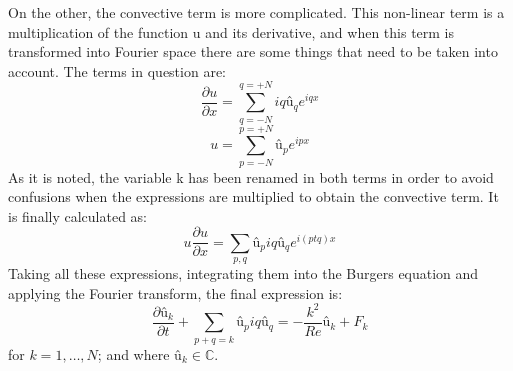 On the other, the convective term is more complicated. This non-linear term is a multiplication of the function u and its derivative, and when this term is transformed into Fourier space there are some things that need to be taken into account. The terms in question are:
\begin{equation}
\frac{\partial u}{\partial x}=\sum_{q=-N}^{q=+N}iqû_{q}e^{iqx}
\end{equation}
\begin{equation}
u=\sum_{p=-N}^{p=+N}û_{p}e^{ipx}
\end{equation}
As it is noted, the variable k has been renamed in both terms in order to avoid confusions when the expressions are multiplied to obtain the convective term. It is finally calculated as:
\begin{equation}
u\frac{\partial u}{\partial x}=\sum_{p,q}û_{p}iqû_{q}e^{i\left(ptq\right)x}
\end{equation}
Taking all these expressions, integrating them into the Burgers equation and applying the Fourier transform, the final expression is:
\begin{equation}
\frac{\partial û_{k}}{\partial t}+\sum_{p+q=k}û_{p}iqû_{q}=-\frac{k^{2}}{Re}û_{k}+F_{k}
\end{equation}
for $k=1,\dots, N$; and where $û_{k}\in\mathbb{C}$.

